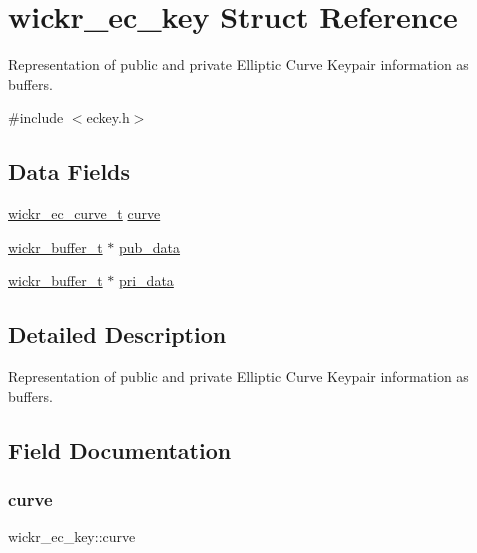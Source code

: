 \hypertarget{structwickr__ec__key}{}\section{wickr\+\_\+ec\+\_\+key Struct Reference}
\label{structwickr__ec__key}


Representation of public and private Elliptic Curve Keypair information as buffers.  




{\ttfamily \#include $<$eckey.\+h$>$}

\subsection*{Data Fields}
\begin{DoxyCompactItemize}
\item 
\mbox{\hyperlink{structwickr__ec__curve}{wickr\+\_\+ec\+\_\+curve\+\_\+t}} \mbox{\hyperlink{structwickr__ec__key_a0fbe90131941d685f618ef6816e8c471}{curve}}
\item 
\mbox{\hyperlink{structwickr__buffer}{wickr\+\_\+buffer\+\_\+t}} $\ast$ \mbox{\hyperlink{structwickr__ec__key_af972d3c8b571df0ef009ebf079705e82}{pub\+\_\+data}}
\item 
\mbox{\hyperlink{structwickr__buffer}{wickr\+\_\+buffer\+\_\+t}} $\ast$ \mbox{\hyperlink{structwickr__ec__key_a67c23110b722401c6ba8b883b3aa74fc}{pri\+\_\+data}}
\end{DoxyCompactItemize}


\subsection{Detailed Description}
Representation of public and private Elliptic Curve Keypair information as buffers. 

\subsection{Field Documentation}
\mbox{\label{structwickr__ec__key_a0fbe90131941d685f618ef6816e8c471}} 
\subsubsection{\texorpdfstring{curve}{curve}}
{\footnotesize\ttfamily wickr\+\_\+ec\+\_\+key\+::curve}

